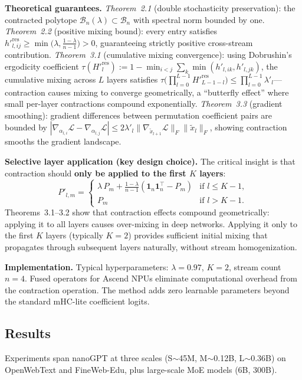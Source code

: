 \documentclass[11pt,a4paper]{article}
\begin{document}
\textbf{Theoretical guarantees.} \emph{Theorem~2.1} (double stochasticity preservation): the contracted polytope $\mathcal{B}_n(\lambda) \subset \mathcal{B}_n$ with spectral norm bounded by one. \emph{Theorem~2.2} (positive mixing bound): every entry satisfies $h'^{\mathrm{res}}_{l,ij} \geq \min\bigl(\lambda, \frac{1-\lambda}{n-1}\bigr) > 0$, guaranteeing strictly positive cross-stream contribution. \emph{Theorem~3.1} (cumulative mixing convergence): using Dobrushin's ergodicity coefficient $\tau(H'^{\mathrm{res}}_l) := 1 - \min_{i<j}\sum_k \min(h'_{l,ik}, h'_{l,jk})$, the cumulative mixing across $L$ layers satisfies $\tau\bigl(\prod_{l=0}^{L-1} H'^{\mathrm{res}}_{L-1-l}\bigr) \leq \prod_{l=0}^{L-1} \lambda'_l$---contraction causes mixing to converge geometrically, a ``butterfly effect'' where small per-layer contractions compound exponentially. \emph{Theorem~3.3} (gradient smoothing): gradient differences between permutation coefficient pairs are bounded by $|\nabla_{\alpha_{l,i}} \mathcal{L} - \nabla_{\alpha_{l,j}} \mathcal{L}| \leq 2\lambda'_l \|\nabla_{\tilde{x}_{l+1}} \mathcal{L}\|_F \|\tilde{x}_l\|_F$, showing contraction smooths the gradient landscape.

\textbf{Selective layer application (key design choice).} The critical insight is that contraction should \textbf{only be applied to the first $K$ layers}:
\[
  P'_{l,m} = \begin{cases}
    \lambda\, P_m + \frac{1-\lambda}{n-1}(\mathbf{1}_n\mathbf{1}_n^\top - P_m) & \text{if } l \leq K-1,\\
    P_m & \text{if } l > K-1.
  \end{cases}
\]
Theorems~3.1--3.2 show that contraction effects compound geometrically: applying it to all layers causes over-mixing in deep networks. Applying it only to the first $K$ layers (typically $K{=}2$) provides sufficient initial mixing that propagates through subsequent layers naturally, without stream homogenization.

\textbf{Implementation.} Typical hyperparameters: $\lambda{=}0.97$, $K{=}2$, stream count $n{=}4$. Fused operators for Ascend NPUs eliminate computational overhead from the contraction operation. The method adds zero learnable parameters beyond the standard mHC-lite coefficient logits.

\subsection{Results}
Experiments span nanoGPT at three scales (S${\sim}$45M, M${\sim}$0.12B, L${\sim}$0.36B) on OpenWebText and FineWeb-Edu, plus large-scale MoE models (6B, 300B).
\end{document}
